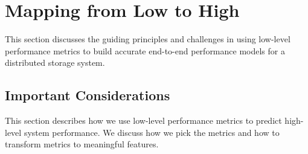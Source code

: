 \section{Mapping from Low to High}
\label{sec:challenges}

This section discusses the guiding principles and challenges in using low-level performance metrics
to build accurate end-to-end performance models for a distributed storage system.

\subsection{Important Considerations}

This section describes how we use low-level performance metrics
to predict high-level system performance.
We discuss how we pick the metrics and how to transform metrics
to meaningful features.

\label{sec:feaatures_for_distributed_system}


